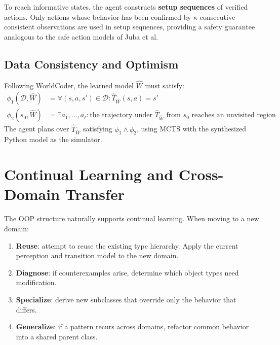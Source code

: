 \documentclass{article}
\newcommand{\calD}{\mathcal{D}}
\begin{document}
To reach informative states, the agent constructs \textbf{setup sequences}
of verified actions.  Only actions whose behavior has been confirmed by
$\kappa$ consecutive consistent observations are used in setup sequences,
providing a safety guarantee analogous to the safe action models of
Juba et al.

\subsection{Data Consistency and Optimism}
\label{sec:phi}

Following WorldCoder, the learned model $\hat{W}$ must satisfy:
\begin{align}
\phi_1(\calD, \hat{W}) &= \forall (s, a, s') \in \calD :
    \hat{T}_{\hat{W}}(s, a) = s'
    \tag{data consistency} \\
\phi_2(s_0, \hat{W}) &= \exists a_1, \ldots, a_\ell :
    \text{the trajectory under } \hat{T}_{\hat{W}} \text{ from } s_0
    \text{ reaches an unvisited region}
    \tag{optimism}
\end{align}
The agent plans over $\hat{T}_{\hat{W}}$ satisfying $\phi_1 \wedge \phi_2$,
using MCTS with the synthesized Python model as the simulator.



\section{Continual Learning and Cross-Domain Transfer}
\label{sec:continual}

The OOP structure naturally supports continual learning.  When moving to a
new domain:

\begin{enumerate}[nosep]
    \item \textbf{Reuse}: attempt to reuse the existing type hierarchy.
          Apply the current perception and transition model to the new domain.
    \item \textbf{Diagnose}: if counterexamples arise, determine which
          object types need modification.
    \item \textbf{Specialize}: derive new subclasses that override only
          the behavior that differs.
    \item \textbf{Generalize}: if a pattern recurs across domains, refactor
          common behavior into a shared parent class.
\end{enumerate}
\end{document}
